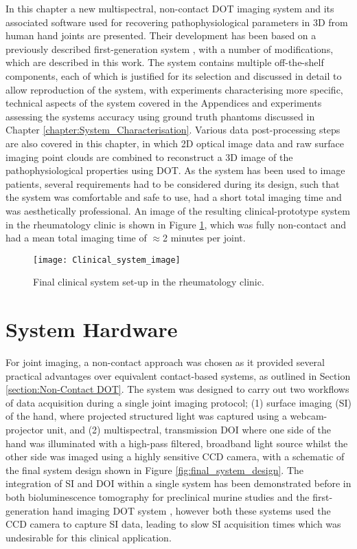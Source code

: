 \documentclass[twoside]{bhamthesis}
\theoremstyle{definition}
\begin{document}
In this chapter a new multispectral, non-contact DOT imaging system and its associated software used for recovering pathophysiological parameters in 3D from human hand joints are presented. Their development has been based on a previously described first-generation system \cite{wu2016development}, with a number of modifications, which are described in this work. The system contains multiple off-the-shelf components, each of which is justified for its selection and discussed in detail to allow reproduction of the system, with experiments characterising more specific, technical aspects of the system covered in the Appendices and experiments assessing the systems accuracy using ground truth phantoms discussed in Chapter \ref{chapter:System_Characterisation}. Various data post-processing steps are also covered in this chapter, in which 2D optical image data and raw surface imaging point clouds are combined to reconstruct a 3D image of the pathophysiological properties using DOT. As the system has been used to image patients, several requirements had to be considered during its design, such that the system was comfortable and safe to use, had a short total imaging time and was aesthetically professional. An image of the resulting clinical-prototype system in the rheumatology clinic is shown in Figure \ref{fig:Clinical_system_image}, which was fully non-contact and had a mean total imaging time of $\approx$2 minutes per joint. 

\begin{figure}[!ht]
\centering
  \texttt{[image: Clinical\_system\_image]}
\caption{Final clinical system set-up in the rheumatology clinic.}
  \label{fig:Clinical_system_image}
\end{figure}

\section{System Hardware}

For joint imaging, a non-contact approach was chosen as it provided several practical advantages over equivalent contact-based systems, as outlined in Section \ref{section:Non-Contact DOT}. The system was designed to carry out two workflows of data acquisition during a single joint imaging protocol; (1) surface imaging (SI) of the hand, where projected structured light was captured using a webcam-projector unit, and (2) multispectral, transmission DOI where one side of the hand was illuminated with a high-pass filtered, broadband light source whilst the other side was imaged using a highly sensitive CCD camera, with a schematic of the final system design shown in Figure \ref{fig:final_system_design}. The integration of SI and DOI within a single system has been demonstrated before in both bioluminescence tomography for preclinical murine studies \cite{guggenheim2013multi} and the first-generation hand imaging DOT system \cite{wu2016development}, however both these systems used the CCD camera to capture SI data, leading to slow SI acquisition times which was undesirable for this clinical application.
\end{document}
